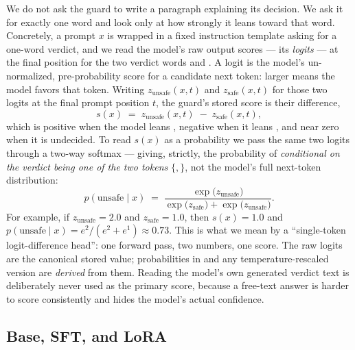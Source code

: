 We do not ask the guard to write a paragraph explaining its decision. We ask it for exactly one
word and look only at how strongly it leans toward that word. Concretely, a prompt $x$ is wrapped in a
fixed instruction template asking for a one-word verdict, and we read the model's raw output scores
--- its \emph{logits} --- at the final position for the two verdict words  and
. A logit is the model's un-normalized, pre-probability score for a candidate next token:
larger means the model favors that token. Writing $z_{\text{unsafe}}(x,t)$ and $z_{\text{safe}}(x,t)$
for those two logits at the final prompt position $t$, the guard's stored score is their difference,
\begin{equation}
\label{eq:score}
s(x) \;=\; z_{\text{unsafe}}(x,t) \;-\; z_{\text{safe}}(x,t),
\end{equation}
which is positive when the model leans , negative when it leans , and near zero
when it is undecided. To read $s(x)$ as a probability we pass the same two logits through a two-way
softmax --- giving, strictly, the probability of  \emph{conditional on the verdict being one
of the two tokens} $\{$$,$$\}$, not the model's full next-token distribution:
\begin{equation}
\label{eq:prob}
p(\text{unsafe}\mid x) \;=\; \frac{\exp\!\big(z_{\text{unsafe}}\big)}{\exp\!\big(z_{\text{safe}}\big)+\exp\!\big(z_{\text{unsafe}}\big)}.
\end{equation}
For example, if $z_{\text{unsafe}}=2.0$ and $z_{\text{safe}}=1.0$, then $s(x)=1.0$ and
$p(\text{unsafe}\mid x)=e^{2}/(e^{2}+e^{1})\approx 0.73$. This is what we mean by a
``single-token logit-difference head'': one forward pass, two numbers, one score. The raw logits are
the canonical stored value; probabilities in  and any temperature-rescaled version are
\emph{derived} from them. Reading the model's own generated verdict text is deliberately never used as
the primary score, because a free-text answer is harder to score consistently and hides the model's
actual confidence.

\subsection{Base, SFT, and LoRA}
\label{sec:bg-sft}

